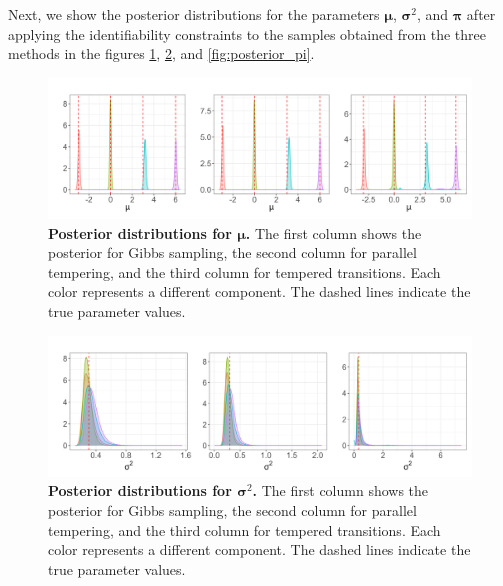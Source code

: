 \documentclass[11pt]{article}
\newcommand{\bpi}{\boldsymbol{\pi}}
\newcommand{\bmu}{\boldsymbol{\mu}}
\newcommand{\bsigma}{\boldsymbol{\sigma}}
\begin{document}
Next, we show the posterior distributions for the parameters $\bmu$, $\bsigma^2$, and $\bpi$ after applying
the identifiability constraints to the samples obtained from the three methods in the figures 
\ref{fig:posterior_mu}, \ref{fig:posterior_sigma}, and \ref{fig:posterior_pi}.

\begin{figure}[!ht]
    \centering
    \includegraphics[scale=0.55]{figures/post_mu_random_beta.png}
    \caption{\textbf{Posterior distributions for $\bmu$.} The first column shows the posterior for Gibbs sampling,
    the second column for parallel tempering, and the third column for tempered transitions. Each color
    represents a different component. The dashed lines indicate the true parameter values.}
    \label{fig:posterior_mu}
\end{figure}

\begin{figure}[!ht]
    \centering
    \includegraphics[scale=0.55]{figures/post_sigma2_random_beta.png}
    \caption{\textbf{Posterior distributions for $\bsigma^2$.} The first column shows the posterior for Gibbs 
    sampling, the second column for parallel tempering, and the third column for tempered transitions. Each color
    represents a different component. The dashed lines indicate the true parameter values.}
    \label{fig:posterior_sigma}
\end{figure}
\end{document}
